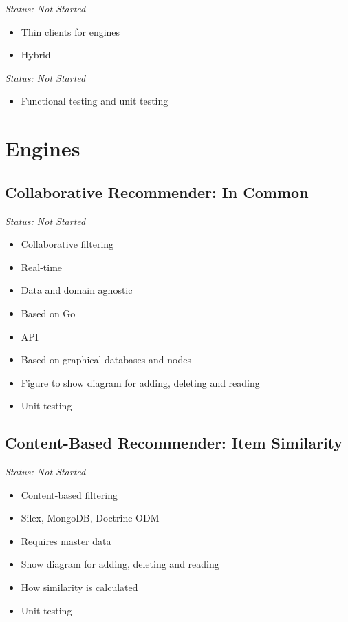 \emph{Status: Not Started}

\begin{itemize}
\item Thin clients for engines
\item Hybrid
\end{itemize}

\emph{Status: Not Started}

\begin{itemize}
\item Functional testing and unit testing
\end{itemize}

\section{Engines}

\subsection{Collaborative Recommender: In Common}

\emph{Status: Not Started}

\begin{itemize}
\item Collaborative filtering
\item Real-time
\item Data and domain agnostic
\item Based on Go
\item API
\item Based on graphical databases and nodes
\item Figure to show diagram for adding, deleting and reading
\item Unit testing
\end{itemize}

\subsection{Content-Based Recommender: Item Similarity}

\emph{Status: Not Started}

\begin{itemize}
\item Content-based filtering
\item Silex, MongoDB, Doctrine ODM
\item Requires master data
\item Show diagram for adding, deleting and reading
\item How similarity is calculated
\item Unit testing
\end{itemize}

